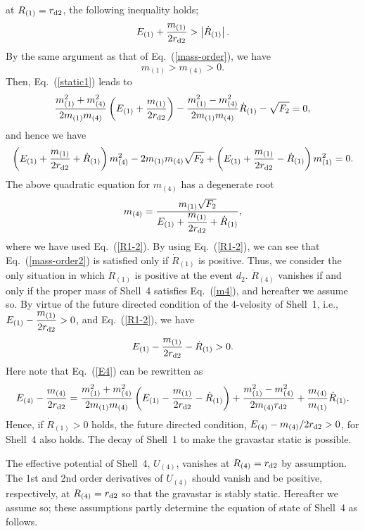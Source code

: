 \documentclass[aps,preprint,preprintnumber,nofootinbib,amsmath,amssymb,ascmac,bm,12pt]{revtex4}
\newcommand{\rdt}{r_{\rm d2}}
\newcommand{\mo}{m_{(1)}}
\newcommand{\mf}{m_{(4)}}
\newcommand{\Ron}{R_{(1)}}
\newcommand{\Eon}{E_{(1)}}
\newcommand{\Efo}{E_{(4)}}
\begin{document}
at $\Ron=\rdt$, the following inequality holds; 
$$
\Eon+\frac{\mo}{2\rdt}>\left|\dot{R}_{(1)}\right|. 
$$
By the same argument as that of Eq.~(\ref{mass-order}), we have
\begin{equation}
\mo>\mf>0.   \label{mass-order2}
\end{equation}
Then, Eq.~(\ref{static1}) leads to
$$
\frac{\mo^2+\mf^2}{2\mo\mf}\left(\Eon+\frac{\mo}{2\rdt}\right)
-\frac{\mo^2-\mf^2}{2\mo\mf}\dot{R}_{(1)}-\sqrt{F_2}=0,
$$
and hence we have 
$$
\left(\Eon+\frac{\mo}{2\rdt}+\dot{R}_{(1)}\right)\mf^2-2\mo\mf\sqrt{F_2}+\left(\Eon+\frac{\mo}{2\rdt}-\dot{R}_{(1)}\right)\mo^2=0.
$$
The above quadratic equation for $\mf$ has a degenerate root
\begin{equation}
\mf=\frac{\mo\sqrt{F_2}}{\Eon+\dfrac{\mo}{2\rdt}+\dot{R}_{(1)}}, \label{m4}
\end{equation}
where we have used Eq.~(\ref{R1-2}).
By using Eq.~(\ref{R1-2}), we can see that Eq.~(\ref{mass-order2}) is satisfied only 
if $\dot{R}_{(1)}$ is positive. 
Thus, we consider the only situation in which $\dot{R}_{(1)}$ is positive at the event $d_2$. 
$\dot{R}_{(4)}$ vanishes if and only if the proper mass of Shell~4 satisfies Eq.~(\ref{m4}), 
and hereafter we assume so. By virtue of the future directed condition of the 
4-velosity of Shell~1, i.e., $\Eon-\dfrac{\mo}{2\rdt}>0$, and Eq.~(\ref{R1-2}), we have
$$
\Eon-\dfrac{\mo}{2\rdt}-\dot{R}_{(1)}>0. 
$$
Here note that Eq.~(\ref{E4}) can be rewritten as
$$
\Efo-\frac{\mf}{2\rdt}=\frac{\mo^2+\mf^2}{2\mo\mf}\left(\Eon-\frac{\mo}{2\rdt}-\dot{R}_{(1)}\right)
+\frac{\mo^2-\mf^2}{2\mf\rdt}+\frac{\mf}{\mo}\dot{R}_{(1)} . 
$$
Hence, if $\dot{R}_{(1)}>0$ holds, the future directed condition, $\Efo-\mf/2\rdt>0$, for Shell~4 also holds. 
The decay of Shell~1 to make the gravastar static is possible. 


The effective potential of Shell~4, $U_{(4)}$, vanishes at $R_{(4)}=\rdt$ by assumption. 
The 1st and 2nd order derivatives of $U_{(4)}$ should vanish and be positive, respectively, 
at $R_{(4)}=\rdt$ so that the gravastar is stably static. Hereafter we assume so; these assumptions 
partly determine the equation of state of Shell~4 as follows.
\end{document}
